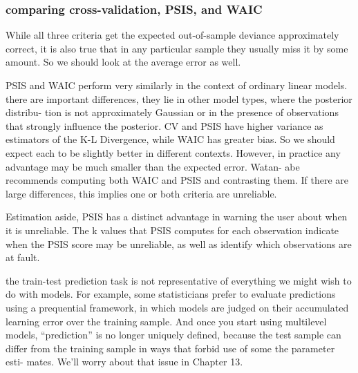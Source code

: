\documentclass[
]{article}
\begin{document}
\hypertarget{comparing-cross-validation-psis-and-waic}{%
\subsubsection{comparing cross-validation, PSIS, and
WAIC}\label{comparing-cross-validation-psis-and-waic}}

While all three criteria get the expected out-of-sample deviance
approximately correct, it is also true that in any particular sample
they usually miss it by some amount. So we should look at the average
error as well.

PSIS and WAIC perform very similarly in the context of ordinary linear
models. there are important differences, they lie in other model types,
where the posterior distribu- tion is not approximately Gaussian or in
the presence of observations that strongly influence the posterior. CV
and PSIS have higher variance as estimators of the K-L Divergence, while
WAIC has greater bias. So we should expect each to be slightly better in
different contexts. However, in practice any advantage may be much
smaller than the expected error. Watan- abe recommends computing both
WAIC and PSIS and contrasting them. If there are large differences, this
implies one or both criteria are unreliable.

Estimation aside, PSIS has a distinct advantage in warning the user
about when it is unreliable. The k values that PSIS computes for each
observation indicate when the PSIS score may be unreliable, as well as
identify which observations are at fault.

the train-test prediction task is not representative of everything we
might wish to do with models. For example, some statisticians prefer to
evaluate predictions using a prequential framework, in which models are
judged on their accumulated learning error over the training sample. And
once you start using multilevel models, ``prediction'' is no longer
uniquely defined, because the test sample can differ from the training
sample in ways that forbid use of some the parameter esti- mates. We'll
worry about that issue in Chapter 13.
\end{document}
